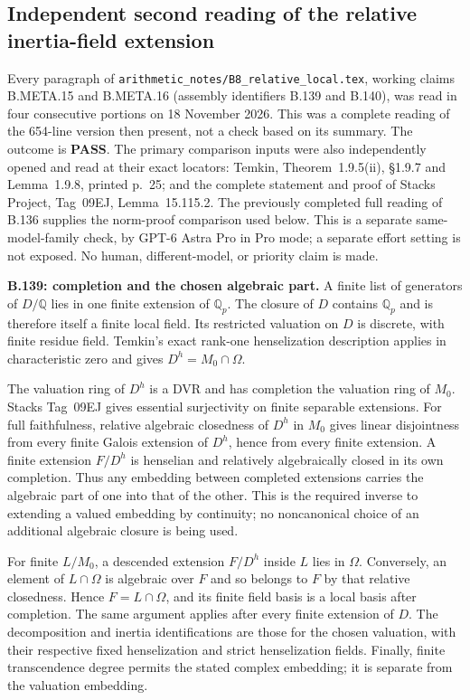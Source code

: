 \subsection*{Independent second reading of the relative inertia-field extension}

Every paragraph of
\texttt{arithmetic\_notes/B8\_relative\_local.tex},
working claims B.META.15 and B.META.16 (assembly identifiers
B.139 and B.140), was read in four consecutive portions on
18 November 2026.  This was a complete reading of the 654-line
version then present, not a check based on its summary.
The outcome is \textbf{PASS}.  The primary comparison inputs
were also independently opened and read at their exact
locators: Temkin, Theorem~1.9.5(ii), \S1.9.7 and
Lemma~1.9.8, printed p.~25; and the complete statement and
proof of Stacks Project, Tag~09EJ, Lemma~15.115.2.
The previously completed full reading of B.136 supplies the
norm-proof comparison used below.  This is a separate
same-model-family check, by GPT-6 Astra Pro in Pro mode;
a separate effort setting is not exposed.  No human,
different-model, or priority claim is made.

\medskip\noindent\textbf{B.139: completion and the chosen algebraic part.}
A finite list of generators of $D/\mathbb Q$ lies in one
finite extension of $\mathbb Q_p$.  The closure of $D$
contains $\mathbb Q_p$ and is therefore itself a finite
local field.  Its restricted valuation on $D$ is discrete,
with finite residue field.  Temkin's exact rank-one
henselization description applies in characteristic zero
and gives $D^h=M_0\cap\Omega$.

The valuation ring of $D^h$ is a DVR and has completion
the valuation ring of $M_0$.  Stacks Tag~09EJ gives
essential surjectivity on finite separable extensions.
For full faithfulness, relative algebraic closedness of
$D^h$ in $M_0$ gives linear disjointness from every finite
Galois extension of $D^h$, hence from every finite
extension.  A finite extension $F/D^h$ is henselian and
relatively algebraically closed in its own completion.
Thus any embedding between completed extensions carries
the algebraic part of one into that of the other.  This
is the required inverse to extending a valued embedding
by continuity; no noncanonical choice of an additional
algebraic closure is being used.

For finite $L/M_0$, a descended extension $F/D^h$ inside
$L$ lies in $\Omega$.  Conversely, an element of
$L\cap\Omega$ is algebraic over $F$ and so belongs to
$F$ by that relative closedness.  Hence $F=L\cap\Omega$,
and its finite field basis is a local basis after
completion.  The same argument applies after every
finite extension of $D$.  The decomposition and inertia
identifications are those for the chosen valuation,
with their respective fixed henselization and strict
henselization fields.  Finally, finite transcendence
degree permits the stated complex embedding; it is
separate from the valuation embedding.

